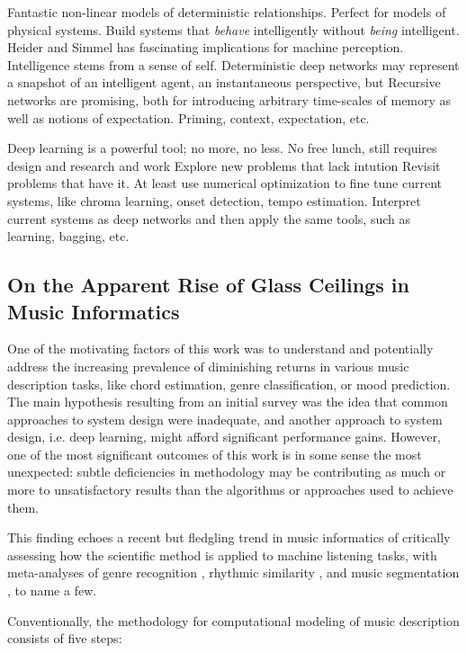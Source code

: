 Fantastic non-linear models of deterministic relationships.
Perfect for models of physical systems.
Build systems that \emph{behave} intelligently without \emph{being} intelligent.
Heider and Simmel \cite{Heider1944} has fascinating implications for machine perception.
Intelligence stems from a sense of self.
Deterministic deep networks may represent a snapshot of an intelligent agent, an instantaneous perspective, but
Recursive networks are promising, both for introducing arbitrary time-scales of memory as well as notions of expectation.
Priming, context, expectation, etc.

Deep learning is a powerful tool; no more, no less.
No free lunch, still requires design and research and work
Explore new problems that lack intution
Revisit problems that have it.
At least use numerical optimization to fine tune current systems, like chroma learning, onset detection, tempo estimation.
Interpret current systems as deep networks and then apply the same tools, such as learning, bagging, etc.


\subsection{On the Apparent Rise of Glass Ceilings in Music Informatics}

One of the motivating factors of this work was to understand and potentially address the increasing prevalence of diminishing returns in various music description tasks, like chord estimation, genre classification, or mood prediction.
The main hypothesis resulting from an initial survey was the idea that common approaches to system design were inadequate, and another approach to system design, i.e. deep learning, might afford significant performance gains.
However, one of the most significant outcomes of this work is in some sense the most unexpected:
subtle deficiencies in methodology may be contributing as much or more to unsatisfactory results than the algorithms or approaches used to achieve them.

This finding echoes a recent but fledgling trend in music informatics of critically assessing how the scientific method is applied to machine listening tasks, with meta-analyses of genre recognition \cite{Sturm20inf}, rhythmic similarity \cite{Esparza2014}, and music segmentation \cite{Neito2015}, to name a few.

Conventionally, the methodology for computational modeling of music description consists of five steps:

